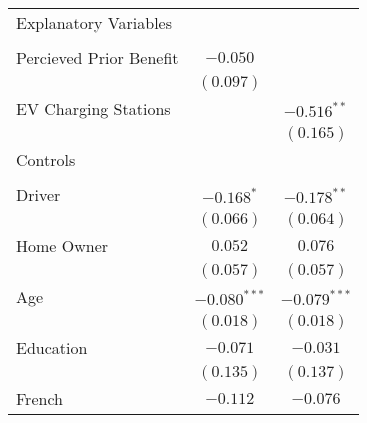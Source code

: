 \begin{center}
\begin{tiny}
\begin{longtable}{l@{} c@{} c@{}}
Explanatory Variables                                                       &                  &                  \\
                                                                            &                  &                  \\
\quad Percieved Prior Benefit                                               & $-0.050$         &                  \\
                                                                            & $(0.097)$        &                  \\
\quad EV Charging Stations                                                  &                  & $-0.516^{**}$    \\
                                                                            &                  & $(0.165)$        \\
Controls                                                                    &                  &                  \\
                                                                            &                  &                  \\
\quad Driver                                                                & $-0.168^{*}$     & $-0.178^{**}$    \\
                                                                            & $(0.066)$        & $(0.064)$        \\
\quad Home Owner                                                            & $0.052$          & $0.076$          \\
                                                                            & $(0.057)$        & $(0.057)$        \\
\quad Age                                                                   & $-0.080^{***}$   & $-0.079^{***}$   \\
                                                                            & $(0.018)$        & $(0.018)$        \\
\quad Education                                                             & $-0.071$         & $-0.031$         \\
                                                                            & $(0.135)$        & $(0.137)$        \\
\quad French                                                                & $-0.112$         & $-0.076$         \\

\end{longtable}
\end{tiny}
\end{center}

